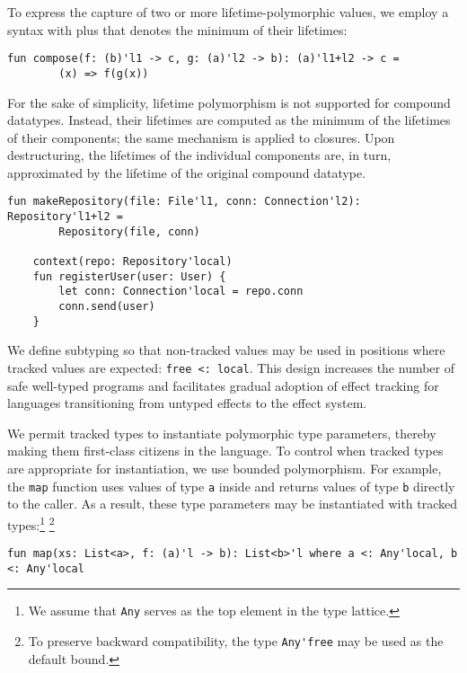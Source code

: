 \documentclass[acmsmall,review,screen]{acmart}
\begin{document}
To express the capture of two or more lifetime-polymorphic values, we employ a syntax with plus that denotes the minimum of their lifetimes:
\begin{lstlisting}[language=colang]
    fun compose(f: (b)'l1 -> c, g: (a)'l2 -> b): (a)'l1+l2 -> c =
        (x) => f(g(x))
\end{lstlisting}

For the sake of simplicity, lifetime polymorphism is not supported for compound datatypes.
Instead, their lifetimes are computed as the minimum of the lifetimes of their components; the same mechanism is applied to closures.
Upon destructuring, the lifetimes of the individual components are, in turn, approximated by the lifetime of the original compound datatype.
\begin{lstlisting}[language=colang]
    fun makeRepository(file: File'l1, conn: Connection'l2): Repository'l1+l2 =
        Repository(file, conn)

    context(repo: Repository'local)
    fun registerUser(user: User) {
        let conn: Connection'local = repo.conn
        conn.send(user)
    }
\end{lstlisting}

We define subtyping so that non-tracked values may be used in positions where tracked values are expected: \lstinline[language=colang]|free <: local|.
This design increases the number of safe well-typed programs and facilitates gradual adoption of effect tracking for languages transitioning from untyped effects to the effect system.

We permit tracked types to instantiate polymorphic type parameters, thereby making them first-class citizens in the language.
To control when tracked types are appropriate for instantiation, we use bounded polymorphism.
For example, the \lstinline[language=colang]|map| function uses values of type \lstinline[language=colang]|a| inside and returns values of type \lstinline[language=colang]|b| directly to the caller.
As a result, these type parameters may be instantiated with tracked types:\footnote{We assume that \lstinline[language=colang]|Any| serves as the top element in the type lattice.} \footnote{To preserve backward compatibility, the type \lstinline[language=colang]|Any'free| may be used as the default bound.}
\begin{lstlisting}[language=colang]
    fun map(xs: List<a>, f: (a)'l -> b): List<b>'l where a <: Any'local, b <: Any'local
\end{lstlisting}
\end{document}
